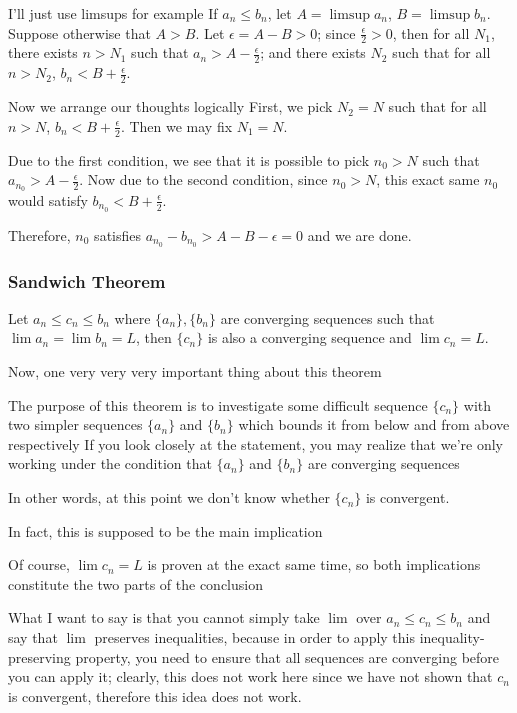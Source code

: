 I'll just use limsups for example
If $a_n\le b_n$, let $A=\limsup a_n$, $B=\limsup b_n$. Suppose otherwise that $A>B$. Let $\epsilon=A-B>0$; since $\frac{\epsilon}{2}>0$, then for all $N_1$, there exists $n>N_1$ such that $a_n>A-\frac{\epsilon}{2}$; and there exists $N_2$ such that for all $n>N_2$, $b_n<B+\frac{\epsilon}{2}$.

Now we arrange our thoughts logically
First, we pick $N_2=N$ such that for all $n>N$, $b_n<B+\frac{\epsilon}{2}$. Then we may fix $N_1=N$.

Due to the first condition, we see that it is possible to pick $n_0>N$ such that $a_{n_0}>A-\frac{\epsilon}{2}$.
Now due to the second condition, since $n_0>N$, this exact same $n_0$ would satisfy $b_{n_0}<B+\frac{\epsilon}{2}$.

Therefore, $n_0$ satisfies $a_{n_0}-b_{n_0}>A-B-\epsilon=0$ and we are done.

\subsubsection{Sandwich Theorem}
\begin{theorem}
Let $a_n\le c_n\le b_n$ where $\{a_n\},\{b_n\}$ are converging sequences such that $\lim a_n=\lim b_n=L$, then $\{c_n\}$ is also a converging sequence and $\lim c_n=L$.
\end{theorem}


Now, one very very very important thing about this theorem

The purpose of this theorem is to investigate some difficult sequence $\{c_n\}$ with two simpler sequences $\{a_n\}$ and $\{b_n\}$ which bounds it from below and from above respectively
If you look closely at the statement, you may realize that we're only working under the condition that $\{a_n\}$ and $\{b_n\}$ are converging sequences

In other words, at this point we don't know whether $\{c_n\}$ is convergent.

In fact, this is supposed to be the main implication

Of course, $\lim c_n=L$ is proven at the exact same time, so both implications constitute the two parts of the conclusion

What I want to say is that you cannot simply take $\lim$ over $a_n\le c_n\le b_n$ and say that $\lim$ preserves inequalities, because in order to apply this inequality-preserving property, you need to ensure that all sequences are converging before you can apply it; clearly, this does not work here since we have not shown that $c_n$ is convergent, therefore this idea does not work.

